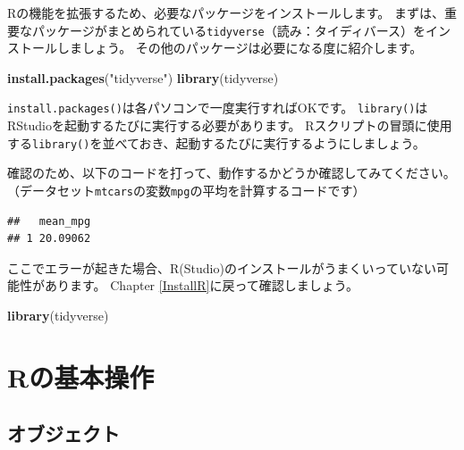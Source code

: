 \documentclass[]{book}
\newenvironment{Shaded}{\begin{snugshade}}{\end{snugshade}}
\newcommand{\KeywordTok}[1]{\textcolor[rgb]{0.13,0.29,0.53}{\textbf{#1}}}
\newcommand{\DataTypeTok}[1]{\textcolor[rgb]{0.13,0.29,0.53}{#1}}
\newcommand{\StringTok}[1]{\textcolor[rgb]{0.31,0.60,0.02}{#1}}
\newcommand{\OperatorTok}[1]{\textcolor[rgb]{0.81,0.36,0.00}{\textbf{#1}}}
\newcommand{\NormalTok}[1]{#1}
\begin{document}
Rの機能を拡張するため、必要なパッケージをインストールします。
まずは、重要なパッケージがまとめられている\texttt{tidyverse}（読み：タイディバース）をインストールしましょう。
その他のパッケージは必要になる度に紹介します。

\begin{Shaded}
\begin{Highlighting}[]
\KeywordTok{install.packages}\NormalTok{(}\StringTok{"tidyverse"}\NormalTok{)}
\KeywordTok{library}\NormalTok{(tidyverse)}
\end{Highlighting}
\end{Shaded}

\texttt{install.packages()}は各パソコンで一度実行すればOKです。
\texttt{library()}はRStudioを起動するたびに実行する必要があります。
Rスクリプトの冒頭に使用する\texttt{library()}を並べておき、起動するたびに実行するようにしましょう。

確認のため、以下のコードを打って、動作するかどうか確認してみてください。
（データセット\texttt{mtcars}の変数\texttt{mpg}の平均を計算するコードです）

\begin{Shaded}
\end{Shaded}

\begin{verbatim}
##   mean_mpg
## 1 20.09062
\end{verbatim}

ここでエラーが起きた場合、R(Studio)のインストールがうまくいっていない可能性があります。
Chapter \ref{InstallR}に戻って確認しましょう。

\begin{Shaded}
\begin{Highlighting}[]
\KeywordTok{library}\NormalTok{(tidyverse)}
\end{Highlighting}
\end{Shaded}

\chapter{Rの基本操作}\label{Rbasics}

\section{オブジェクト}\label{ux30aaux30d6ux30b8ux30a7ux30afux30c8}
\end{document}
